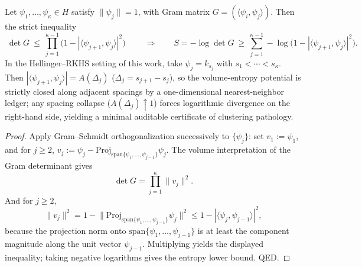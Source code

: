 \begin{proposition}\label{prop:xi-gram-det-nearest-neighbor-product-upper-bound}
Let \(\psi_1,\dots,\psi_\kappa\in H\) satisfy \(\|\psi_j\|=1\), with Gram matrix \(G=(\langle\psi_i,\psi_j\rangle)\).
Then the strict inequality
\[
\boxed{\;
\det G\ \le\ \prod_{j=1}^{\kappa-1}\bigl(1-|\langle\psi_{j+1},\psi_j\rangle|^2\bigr)\;}
\qquad
\Longrightarrow\qquad
S=-\log\det G\ \ge\ \sum_{j=1}^{\kappa-1}-\log\bigl(1-|\langle\psi_{j+1},\psi_j\rangle|^2\bigr).
\]
In the Hellinger--RKHS setting of this work, take \(\psi_j=k_{s_j}\) with \(s_1<\cdots<s_\kappa\). Then \(|\langle\psi_{j+1},\psi_j\rangle|=A(\Delta_j)\) (\(\Delta_j=s_{j+1}-s_j\)), so the volume-entropy potential is strictly closed along adjacent spacings by a one-dimensional nearest-neighbor ledger; any spacing collapse (\(A(\Delta_j)\uparrow 1\)) forces logarithmic divergence on the right-hand side, yielding a minimal auditable certificate of clustering pathology.
\end{proposition}
\begin{proof}
Apply Gram--Schmidt orthogonalization successively to \(\{\psi_j\}\): set
\(
v_1:=\psi_1
\), and for \(j\ge 2\),
\(
v_j:=\psi_j-\mathrm{Proj}_{\mathrm{span}\{\psi_1,\dots,\psi_{j-1}\}}\psi_j
\).
The volume interpretation of the Gram determinant gives
\[
\det G=\prod_{j=1}^{\kappa}\|v_j\|^2.
\]
And for \(j\ge 2\),
\[
\|v_j\|^2=1-\bigl\|\mathrm{Proj}_{\mathrm{span}\{\psi_1,\dots,\psi_{j-1}\}}\psi_j\bigr\|^2
\le 1-|\langle\psi_j,\psi_{j-1}\rangle|^2,
\]
because the projection norm onto \(\mathrm{span}\{\psi_1,\dots,\psi_{j-1}\}\) is at least the component magnitude along the unit vector \(\psi_{j-1}\).
Multiplying yields the displayed inequality; taking negative logarithms gives the entropy lower bound. QED.
\end{proof}


